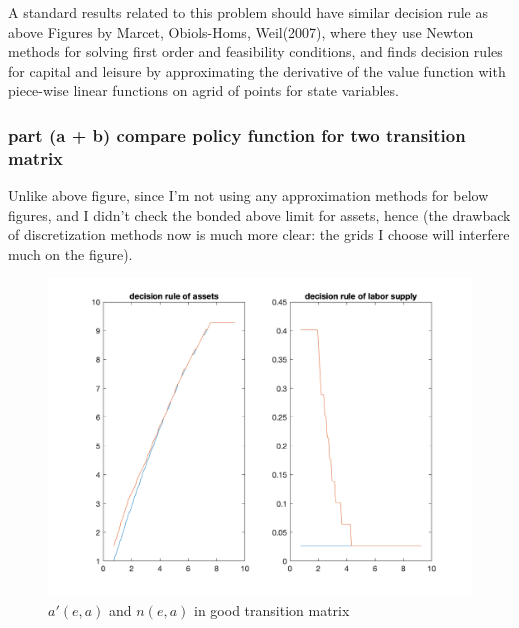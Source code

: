 A standard results related to this problem should have similar decision rule as above Figures by Marcet, Obiols-Homs, Weil(2007), where they use Newton methods for solving first order and feasibility conditions, and finds decision rules for capital and leisure by approximating the derivative of the value function with piece-wise linear functions on agrid of points for state variables.


\subsubsection*{part (a + b) compare policy function for two transition matrix}

Unlike above figure, since I'm not using any approximation methods for below figures, and I didn't check the bonded above limit for assets, hence (the drawback of discretization methods now is much more clear: the grids I choose will interfere much on the figure). 

\begin{figure}[htbp]
\centering
\includegraphics[width=\textwidth]{img/Q1.png}
\caption{$a'(e,a)$ and $n(e,a)$ in good transition matrix}
\end{figure}

